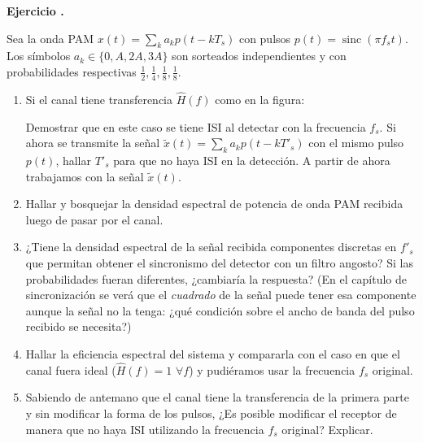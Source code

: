 \documentclass[a4paper,11pt]{article}
\DeclareMathOperator{\sinc}{sinc}
\newcounter{numejer}[section]
\newenvironment{ejercicio}[1][]{
\refstepcounter{numejer}
\noindent \large \textbf{Ejercicio \arabic{section}.\arabic{numejer}} \ifthenelse{\equal{#1}{}}{}{\emph{(#1)}}

\smallskip
}{
\bigskip
}
\begin{document}
\begin{ejercicio}
        Sea la onda PAM $x(t)=\sum_k a_k p(t-k T_s)$ con pulsos $p(t)=\sinc(\pi f_s t)$. Los símbolos $a_k \in \{0, A, 2A, 3A\}$ son sorteados independientes y con probabilidades  respectivas 
        $\frac{1}{2}, \frac{1}{4}, \frac{1}{8}, \frac{1}{8}.$
        
        \begin{enumerate}
        \item Si el canal tiene transferencia $\hat{H}(f)$ como en la figura:

        \begin{center}
        \end{center}

         Demostrar que en este caso se tiene ISI al detectar con la frecuencia $f_s$. Si ahora se transmite la señal $\tilde{x}(t)=\sum_k a_k p(t-k T'_s)$ con el mismo pulso $p(t)$, hallar $T'_s$ para que no haya ISI en la detección. A partir de ahora trabajamos con la señal $\tilde{x}(t)$.
        \item Hallar y bosquejar la densidad espectral de potencia de onda PAM recibida luego de pasar por el canal.
        \item ¿Tiene la densidad espectral de la señal recibida componentes discretas en $f'_s$ que permitan obtener el sincronismo del detector con un filtro angosto? Si las probabilidades fueran diferentes, ¿cambiaría la respuesta? (En el capítulo de sincronización se verá que el \emph{cuadrado} de la señal puede tener esa componente aunque la señal no la tenga: ¿qué condición sobre el ancho de banda del pulso recibido se necesita?)
        \item Hallar la eficiencia espectral del sistema y compararla con el caso en que el canal fuera ideal ($\hat{H}(f) = 1 \,\, \forall f$) y pudiéramos usar la frecuencia $f_s$ original.
        \item Sabiendo de antemano que el canal tiene la transferencia de la primera parte y sin modificar la forma de los pulsos, ¿Es posible modificar el receptor de manera que no haya ISI utilizando la frecuencia $f_s$ original? Explicar.
        \end{enumerate}
        
\end{ejercicio}
\end{document}
